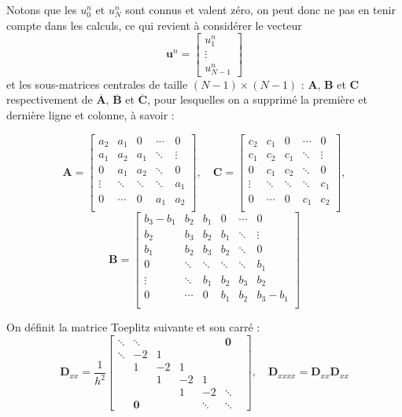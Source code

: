 \documentclass[a4,12pt]{article}
\newcommand{\A}{\mathbf{A}}
\newcommand{\B}{\mathbf{B}}
\newcommand{\C}{\mathbf{C}}
\newcommand{\D}{\mathbf{D}}
\newcommand{\ub}{\mathbf{u}}
\begin{document}
Notons que les $u_0^n$ et $u_{N}^n$ sont connus et valent zéro, on peut donc ne pas en tenir compte dans les calculs, ce qui revient à considérer le vecteur 
\[
  \ub^n=\begin{bmatrix}u_1^n\\ \vdots \\ u_{N-1}^n\end{bmatrix}
\]
et les sous-matrices centrales de taille $(N-1)\times (N-1)$ : $\A$, $\B$ et $\C$ respectivement de $\overline{\A}$, $\overline{\B}$ et $\overline{\C}$, pour lesquelles on a supprimé la première et dernière ligne et colonne, à savoir :

\[
  \A=
  \begin{bmatrix} 
    a_2 & a_1 & 0 & \cdots & 0 \\ 
    a_1 & a_2 & a_1 & \ddots & \vdots \\ 
    0 & a_1 & a_2 & \ddots  & 0 \\ 
    \vdots & \ddots & \ddots & \ddots  & a_1 \\ 
    0 & \cdots & 0 & a_1 & a_2  \\
  \end{bmatrix},\quad 
  \C=
  \begin{bmatrix} 
    c_2 & c_1 & 0 & \cdots & 0 \\ 
    c_1 & c_2 & c_1 & \ddots & \vdots \\ 
    0 & c_1 & c_2 & \ddots  & 0 \\ 
    \vdots & \ddots & \ddots & \ddots  & c_1 \\ 
    0 & \cdots & 0 & c_1 & c_2  \\
  \end{bmatrix},
\]
\[
  \B=
  \begin{bmatrix}
    b_3-b_1 & b_2 & b_1 & 0 & \cdots & 0  \\ 
    b_2 & b_3 & b_2 & b_1 & \ddots & \vdots \\  
    b_1 & b_2 & b_3 & b_2 & \ddots & 0 \\ 
    0 & \ddots & \ddots & \ddots & \ddots &b_1\\ 
    \vdots & \ddots & b_1 & b_2 & b_3 & b_2  \\ 
    0 & \cdots &  0 & b_1 & b_2 & b_3-b_1  \\
  \end{bmatrix}
\]

On définit la matrice Toeplitz suivante et son carré : 
\[
  \D_{xx}=\frac{1}{h^2}
  \begin{bmatrix}
    \ddots & \ddots & & & & \mathbf{0}  & \\
    \ddots & -2 & 1 & & & & \\ 
    & 1 & -2 & 1 & & & \\ 
    & & 1 & -2 & 1 & & \\ 
    & & & 1 & -2 & \ddots \\ 
    & \mathbf{0} & & & \ddots & \ddots
  \end{bmatrix}, 
  \quad \D_{xxxx}=\D_{xx}\D_{xx}
\]
\end{document}

